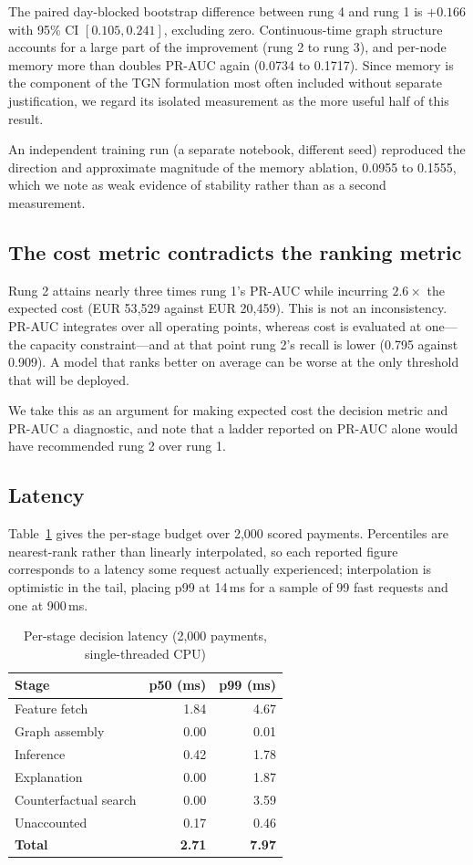 \documentclass[conference]{IEEEtran}
\begin{document}
The paired day-blocked bootstrap difference between rung 4 and rung 1 is
$+0.166$ with 95\% CI $[0.105, 0.241]$, excluding zero. Continuous-time graph
structure accounts for a large part of the improvement (rung 2 to rung 3), and
per-node memory more than doubles PR-AUC again (0.0734 to 0.1717). Since memory
is the component of the TGN formulation most often included without separate
justification, we regard its isolated measurement as the more useful half of
this result.

An independent training run (a separate notebook, different seed) reproduced the
direction and approximate magnitude of the memory ablation, 0.0955 to 0.1555,
which we note as weak evidence of stability rather than as a second measurement.

\subsection{The cost metric contradicts the ranking metric}

Rung 2 attains nearly three times rung 1's PR-AUC while incurring
$2.6\times$ the expected cost (EUR 53{,}529 against EUR 20{,}459). This is not
an inconsistency. PR-AUC integrates over all operating points, whereas cost is
evaluated at one---the capacity constraint---and at that point rung 2's recall
is lower (0.795 against 0.909). A model that ranks better on average can be
worse at the only threshold that will be deployed.

We take this as an argument for making expected cost the decision metric and
PR-AUC a diagnostic, and note that a ladder reported on PR-AUC alone would have
recommended rung 2 over rung 1.

\subsection{Latency}

Table~\ref{tab:latency} gives the per-stage budget over 2{,}000 scored payments.
Percentiles are nearest-rank rather than linearly interpolated, so each reported
figure corresponds to a latency some request actually experienced; interpolation
is optimistic in the tail, placing p99 at 14\,ms for a sample of 99 fast
requests and one at 900\,ms.

\begin{table}[t]
\caption{Per-stage decision latency (2{,}000 payments, single-threaded CPU)}
\label{tab:latency}
\centering
\small
\begin{tabular}{lrr}
\toprule
Stage & p50 (ms) & p99 (ms) \\
\midrule
Feature fetch & 1.84 & 4.67 \\
Graph assembly & 0.00 & 0.01 \\
Inference & 0.42 & 1.78 \\
Explanation & 0.00 & 1.87 \\
Counterfactual search & 0.00 & 3.59 \\
Unaccounted & 0.17 & 0.46 \\
\midrule
\textbf{Total} & \textbf{2.71} & \textbf{7.97} \\
\bottomrule
\end{tabular}
\end{table}
\end{document}
